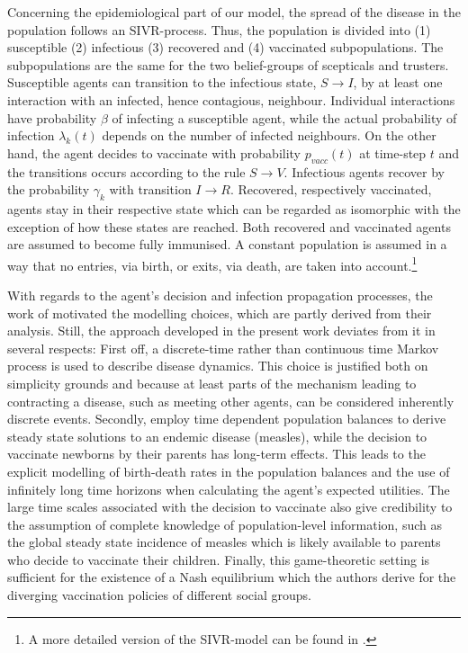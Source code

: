 \documentclass[11pt]{article}
\begin{document}
Concerning the epidemiological part of our model, the spread of the disease in the population follows an SIVR-process. Thus, the population is divided into (1) susceptible (2) infectious (3) recovered and (4) vaccinated subpopulations. The subpopulations are the same for the two belief-groups of scepticals and trusters. Susceptible agents can transition to the infectious state, \(S \rightarrow{} I \), by at least one interaction with an infected, hence contagious, neighbour. Individual interactions have probability \(\beta\) of infecting a susceptible agent, while the actual probability of infection \(\lambda_{k}(t)\) depends on the number of infected neighbours. On the other hand, the agent decides to vaccinate with probability \(p_{vacc}(t)\) at time-step \(t\) and the transitions occurs according to the rule \(S \rightarrow{} V \). Infectious agents recover by the probability \(\gamma_{k}\) with transition \(I \rightarrow{} R\). Recovered, respectively vaccinated, agents stay in their respective state which can be regarded as isomorphic with the exception of how these states are reached. Both recovered and vaccinated agents are assumed to become fully immunised. A constant population is assumed in a way that no entries, via birth, or exits, via death, are taken into account.\footnote{A more detailed version of the SIVR-model can be found in \cite{tornatore2014}.}

With regards to the agent's decision and infection propagation processes, the work of \cite{shim2012} motivated the modelling choices, which are partly derived from their analysis. Still, the approach developed in the present work deviates from it in several respects:
First off, a discrete-time rather than continuous time Markov process is used to describe disease dynamics. This choice is justified both on simplicity grounds and because at least parts of the mechanism leading to contracting a disease, such as meeting other agents, can be considered inherently discrete events. Secondly, \cite{shim2012} employ time dependent population balances to derive steady state solutions to an endemic disease (measles), while the decision to vaccinate newborns by their parents has long-term effects. This leads to the explicit modelling of birth-death rates in the population balances and the use of infinitely long time horizons when calculating the agent's expected utilities. The large time scales associated with the decision to vaccinate also give credibility to the assumption of complete knowledge of population-level information, such as the global steady state incidence of measles which is likely available to parents who decide to vaccinate their children. Finally, this game-theoretic setting is sufficient for the existence of a Nash equilibrium which the authors derive for the diverging vaccination policies of different social groups.
\end{document}
